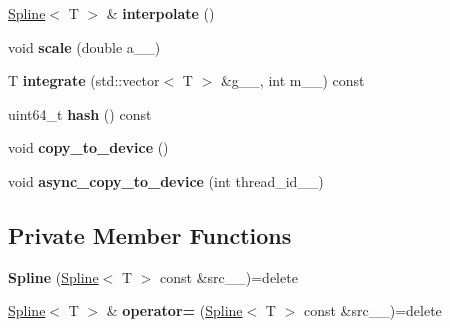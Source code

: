 \begin{DoxyCompactItemize}
\item 
\hypertarget{classsirius_1_1_spline_a144385d9a82ad3560bf7c1a1319bd57a}{}\hyperlink{classsirius_1_1_spline}{Spline}$<$ T $>$ \& {\bfseries interpolate} ()\label{classsirius_1_1_spline_a144385d9a82ad3560bf7c1a1319bd57a}

\item 
\hypertarget{classsirius_1_1_spline_addc42e573cd1d88088d70534e1a32a7a}{}void {\bfseries scale} (double a\+\_\+\+\_\+)\label{classsirius_1_1_spline_addc42e573cd1d88088d70534e1a32a7a}

\item 
\hypertarget{classsirius_1_1_spline_ae114bc54b7917af78fa5fd42ef0702f3}{}T {\bfseries integrate} (std\+::vector$<$ T $>$ \&g\+\_\+\+\_\+, int m\+\_\+\+\_\+) const \label{classsirius_1_1_spline_ae114bc54b7917af78fa5fd42ef0702f3}

\item 
\hypertarget{classsirius_1_1_spline_aceb36b8863947a31a0b13305a9fc811c}{}uint64\+\_\+t {\bfseries hash} () const \label{classsirius_1_1_spline_aceb36b8863947a31a0b13305a9fc811c}

\item 
\hypertarget{classsirius_1_1_spline_a746ce74977369bdb0a0166cbb38ed278}{}void {\bfseries copy\+\_\+to\+\_\+device} ()\label{classsirius_1_1_spline_a746ce74977369bdb0a0166cbb38ed278}

\item 
\hypertarget{classsirius_1_1_spline_a02a0a578bac913ab252ec07634c63e17}{}void {\bfseries async\+\_\+copy\+\_\+to\+\_\+device} (int thread\+\_\+id\+\_\+\+\_\+)\label{classsirius_1_1_spline_a02a0a578bac913ab252ec07634c63e17}

\end{DoxyCompactItemize}
\subsection*{Private Member Functions}
\begin{DoxyCompactItemize}
\item 
\hypertarget{classsirius_1_1_spline_a5ae5a9173faf45a28478c95840a216fa}{}{\bfseries Spline} (\hyperlink{classsirius_1_1_spline}{Spline}$<$ T $>$ const \&src\+\_\+\+\_\+)=delete\label{classsirius_1_1_spline_a5ae5a9173faf45a28478c95840a216fa}

\item 
\hypertarget{classsirius_1_1_spline_a8a97c4d94803f08314a67ba62f6b161b}{}\hyperlink{classsirius_1_1_spline}{Spline}$<$ T $>$ \& {\bfseries operator=} (\hyperlink{classsirius_1_1_spline}{Spline}$<$ T $>$ const \&src\+\_\+\+\_\+)=delete\label{classsirius_1_1_spline_a8a97c4d94803f08314a67ba62f6b161b}

\end{DoxyCompactItemize}
